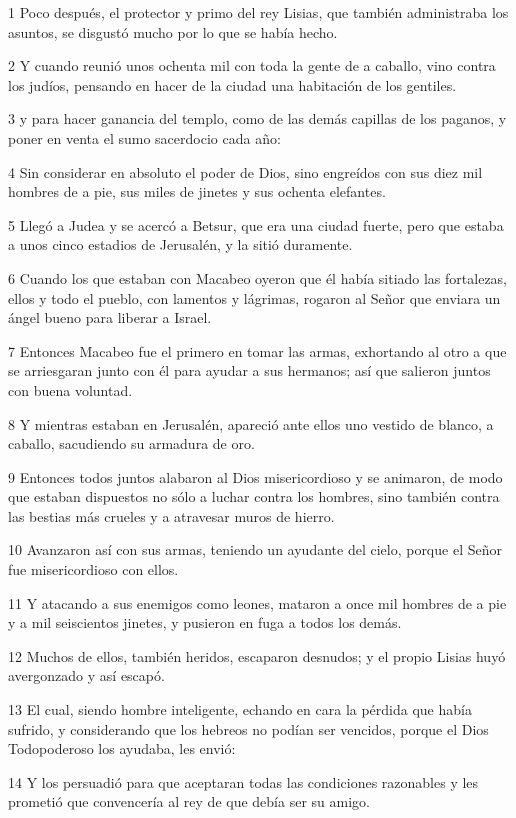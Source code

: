 \par 1 Poco después, el protector y primo del rey Lisias, que también administraba los asuntos, se disgustó mucho por lo que se había hecho.
\par 2 Y cuando reunió unos ochenta mil con toda la gente de a caballo, vino contra los judíos, pensando en hacer de la ciudad una habitación de los gentiles.
\par 3 y para hacer ganancia del templo, como de las demás capillas de los paganos, y poner en venta el sumo sacerdocio cada año:
\par 4 Sin considerar en absoluto el poder de Dios, sino engreídos con sus diez mil hombres de a pie, sus miles de jinetes y sus ochenta elefantes.
\par 5 Llegó a Judea y se acercó a Betsur, que era una ciudad fuerte, pero que estaba a unos cinco estadios de Jerusalén, y la sitió duramente.
\par 6 Cuando los que estaban con Macabeo oyeron que él había sitiado las fortalezas, ellos y todo el pueblo, con lamentos y lágrimas, rogaron al Señor que enviara un ángel bueno para liberar a Israel.
\par 7 Entonces Macabeo fue el primero en tomar las armas, exhortando al otro a que se arriesgaran junto con él para ayudar a sus hermanos; así que salieron juntos con buena voluntad.
\par 8 Y mientras estaban en Jerusalén, apareció ante ellos uno vestido de blanco, a caballo, sacudiendo su armadura de oro.
\par 9 Entonces todos juntos alabaron al Dios misericordioso y se animaron, de modo que estaban dispuestos no sólo a luchar contra los hombres, sino también contra las bestias más crueles y a atravesar muros de hierro.
\par 10 Avanzaron así con sus armas, teniendo un ayudante del cielo, porque el Señor fue misericordioso con ellos.
\par 11 Y atacando a sus enemigos como leones, mataron a once mil hombres de a pie y a mil seiscientos jinetes, y pusieron en fuga a todos los demás.
\par 12 Muchos de ellos, también heridos, escaparon desnudos; y el propio Lisias huyó avergonzado y así escapó.
\par 13 El cual, siendo hombre inteligente, echando en cara la pérdida que había sufrido, y considerando que los hebreos no podían ser vencidos, porque el Dios Todopoderoso los ayudaba, les envió:
\par 14 Y los persuadió para que aceptaran todas las condiciones razonables y les prometió que convencería al rey de que debía ser su amigo.
